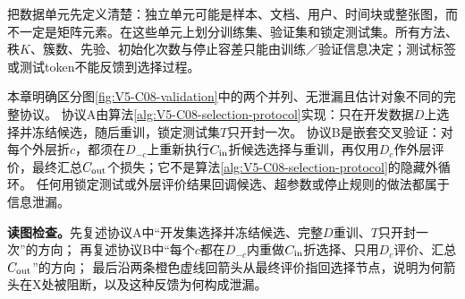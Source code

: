 \documentclass[UTF8,a4paper,11pt,openany]{ctexbook}
\begin{document}
\makeatletter
{}
\makeatother
\setcounter{page}{742}
\setcounter{chapter}{37}
\setcounter{section}{3}
\setcounter{figure}{4}
\pagestyle{headings}
把数据单元先定义清楚：独立单元可能是样本、文档、用户、时间块或整张图，而不一定是矩阵元素。在这些单元上划分训练集、验证集和锁定测试集。所有方法、秩$K$、簇数、先验、初始化次数与停止容差只能由训练／验证信息决定；测试标签或测试token不能反馈到选择过程。

本章明确区分图\ref{fig:V5-C08-validation}中的两个并列、无泄漏且估计对象不同的完整协议。
协议A由算法\ref{alg:V5-C08-selection-protocol}实现：只在开发数据$D$上选择并冻结候选，随后重训，锁定测试集$T$只开封一次。
协议B是嵌套交叉验证：对每个外层折$c$，都须在$D_{-c}$上重新执行$C_{\rm in}$折候选选择与重训，再仅用$D_c$作外层评价，最终汇总$C_{\rm out}$个损失；它不是算法\ref{alg:V5-C08-selection-protocol}的隐藏外循环。
任何用锁定测试或外层评价结果回调候选、超参数或停止规则的做法都属于信息泄漏。

\FloatBarrier
\noindent\textbf{读图检查。}先复述协议A中“开发集选择并冻结候选、完整$D$重训、$T$只开封一次”的方向；
再复述协议B中“每个$c$都在$D_{-c}$内重做$C_{\rm in}$折选择、只用$D_c$评价、汇总$C_{\rm out}$”的方向；
最后沿两条橙色虚线回箭头从最终评价指回选择节点，说明为何箭头在X处被阻断，以及这种反馈为何构成泄漏。
\end{document}
